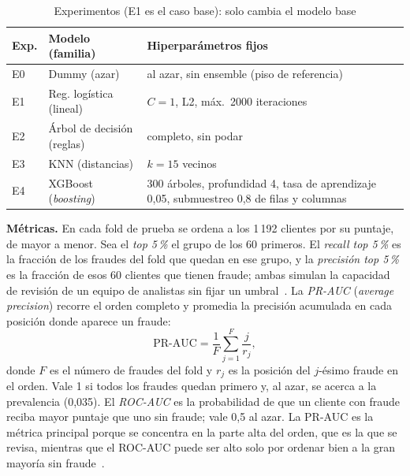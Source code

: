\documentclass[conference,a4paper]{IEEEtran}
\begin{document}
\begin{table}[t]
\caption{Experimentos (E1 es el caso base): solo cambia el modelo base}
\label{tab:modelos}
\centering
\footnotesize
\begin{tabularx}{\columnwidth}{@{}l p{3.05cm} L@{}}
\toprule
Exp. & Modelo (familia) & Hiperparámetros fijos \\
\midrule
E0 & Dummy (azar) & al azar, sin ensemble (piso de referencia) \\
E1 & Reg. logística (lineal) & $C=1$, L2, máx.\ 2000 iteraciones \\
E2 & Árbol de decisión (reglas) & completo, sin podar \\
E3 & KNN (distancias) & $k=15$ vecinos \\
E4 & XGBoost (\emph{boosting})~\cite{chen2016} & 300 árboles, profundidad 4, tasa de aprendizaje 0,05, submuestreo 0,8 de filas y columnas \\
\bottomrule
\end{tabularx}
\end{table}

\textbf{Métricas.} En cada fold de prueba se ordena a los 1\,192 clientes por su puntaje, de
mayor a menor. Sea el \emph{top 5\,\%} el grupo de los 60 primeros. El \emph{recall top 5\,\%}
es la fracción de los fraudes del fold que quedan en ese grupo, y la \emph{precisión top 5\,\%}
es la fracción de esos 60 clientes que tienen fraude; ambas simulan la capacidad de revisión de
un equipo de analistas sin fijar un umbral~\cite{leborgne2022}. La \emph{PR-AUC}
(\emph{average precision}) recorre el orden completo y promedia la precisión acumulada en cada
posición donde aparece un fraude:
\begin{equation}
\text{PR-AUC} = \frac{1}{F}\sum_{j=1}^{F} \frac{j}{r_j},
\end{equation}
donde $F$ es el número de fraudes del fold y $r_j$ es la posición del $j$-ésimo fraude en el
orden. Vale 1 si todos los fraudes quedan primero y, al azar, se acerca a la prevalencia (0,035).
El \emph{ROC-AUC} es la probabilidad de que un cliente con fraude reciba mayor puntaje que uno sin
fraude; vale 0,5 al azar. La PR-AUC es la métrica principal porque se concentra en la parte alta
del orden, que es la que se revisa, mientras que el ROC-AUC puede ser alto solo por ordenar bien
a la gran mayoría sin fraude~\cite{saito2015}.
\end{document}

